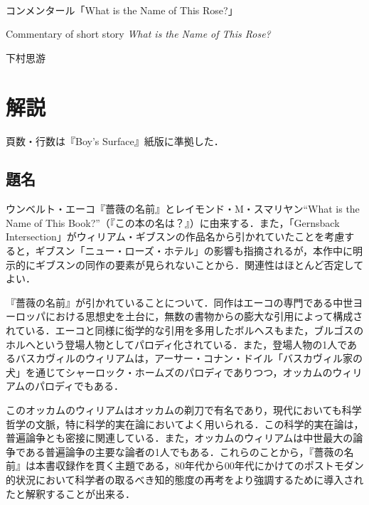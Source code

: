 \documentclass[10pt, a5paper, twoside]{ltjsarticle}
\begin{document}
	~ %

	\begin{center}

		\Large{コンメンタール「What is the Name of This Rose?」}

		\vspace{3mm}

		\large{Commentary of short story \textit{What is the Name of This Rose?}}

		\vspace{3mm}

		\large{下村思游}

	\end{center}

	\vspace{3mm}

	\section{解説}

        頁数・行数は『Boy's Surface』紙版\cite{boys}に準拠した．

        \subsection{題名}

            ウンベルト・エーコ『薔薇の名前』\cite{eco1,eco2}とレイモンド・M・スマリヤン``What is the Name of This Book?''（『この本の名は？』\cite{name}）に由来する．また，「Gernsback Intersection」がウィリアム・ギブスンの作品名から引かれていたことを考慮すると，ギブスン「ニュー・ローズ・ホテル」の影響も指摘されるが，本作中に明示的にギブスンの同作の要素が見られないことから．関連性はほとんど否定してよい．

            『薔薇の名前』が引かれていることについて．同作はエーコの専門である中世ヨーロッパにおける思想史を土台に，無数の書物からの膨大な引用によって構成されている．エーコと同様に衒学的な引用を多用したボルヘスもまた，ブルゴスのホルへという登場人物としてパロディ化されている．また，登場人物の1人であるバスカヴィルのウィリアムは，アーサー・コナン・ドイル「バスカヴィル家の犬」を通じてシャーロック・ホームズのパロディでありつつ，オッカムのウィリアムのパロディでもある．

            このオッカムのウィリアムはオッカムの剃刀で有名であり，現代においても科学哲学の文脈，特に科学的実在論においてよく用いられる．この科学的実在論は，普遍論争とも密接に関連している\cite{todayamarev}．また，オッカムのウィリアムは中世最大の論争である普遍論争の主要な論者の1人でもある．これらのことから，『薔薇の名前』は本書収録作を貫く主題である，80年代から00年代にかけてのポストモダン的状況において科学者の取るべき知的態度の再考をより強調するために導入されたと解釈することが出来る．
\end{document}
